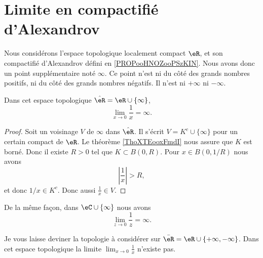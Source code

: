 \section{Limite en compactifié d'Alexandrov}

Nous considérons l'espace topologique localement compact \( \eR\), et son compactifié d'Alexandrov défini en \ref{PROPooHNOZooPSzKIN}. Nous avons donc un point supplémentaire noté \( \infty\). Ce point n'est ni du côté des grands nombres positifs, ni du côté des grands nombres négatifs. Il n'est ni \( +\infty\) ni \( -\infty\).

\begin{proposition}
    Dans cet espace topologique \( \hat \eR=\eR\cup\{ \infty \}\),
    \begin{equation}
        \lim_{x\to 0} \frac{1}{ x }=\infty.
    \end{equation}
\end{proposition}

\begin{proof}
    Soit un voisinage \( V\) de \( \infty\) dans \( \hat \eR\). Il s'écrit \( V=K^c\cup\{ \infty \}\) pour un certain compact de \( \eR\). Le théorème \ref{ThoXTEooxFmdI} nous assure que \( K\) est borné. Donc il existe \( R>0\) tel que \( K\subset B(0,R)\). Pour \( x\in B(0,1/R)\) nous avons
    \begin{equation}
        | \frac{1}{ x } |>R,
    \end{equation}
    et donc \( 1/x\in K^c\). Donc aussi \( \frac{1}{ x }\in V\).
\end{proof}

De la même façon, dans \( \eC\cup\{ \infty \}\) nous avons
\begin{equation}
    \lim_{z\to 0} \frac{1}{ z }=\infty.
\end{equation}

\begin{normaltext}
    Je vous laisse deviner la topologie à considérer sur \( \bar \eR=\eR\cup\{ +\infty,-\infty \}\). Dans cet espace topologique la limite \( \lim_{x\to 0} \frac{1}{ x }\) n'existe pas.
\end{normaltext}

